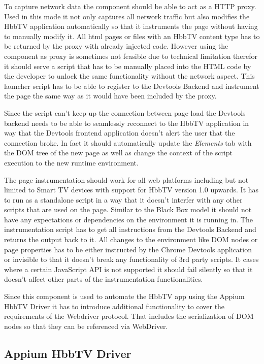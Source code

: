 To capture network data the component should be able to act as a HTTP proxy. Used in this
mode it not only captures all network traffic but also modifies the HbbTV application
automatically so that it instruments the page without having to manually modify it. All
html pages or files with an HbbTV content type has to be returned by the proxy with already
injected code. However using the component as proxy is sometimes not feasible due to technical
limitation therefor it should serve a script that has to be manually placed into the HTML code
by the developer to unlock the same functionality without the network aspect. This launcher
script has to be able to register to the Devtools Backend and instrument the page the same way
as it would have been included by the proxy.

Since the script can't keep up the connection between page load the Devtools backend needs to
be able to seamlessly reconnect to the HbbTV application in way that the Devtools frontend
application doesn't alert the user that the connection broke. In fact it should automatically
update the \textit{Elements} tab with the DOM tree of the new page as well as change the context
of the script execution to the new runtime environment.

The page instrumentation should work for all web platforms including but not limited to Smart TV
devices with support for HbbTV version 1.0 upwards. It has to run as a standalone script in
a way that it doesn't interfer with any other scripts that are used on the page. Similar to the
Black Box model it should not have any expectations or dependencies on the environment it is
running in. The instrumentation script has to get all instructions from the Devtools Backend and
returns the output back to it. All changes to the environment like DOM nodes or page properties
has to be either instructed by the Chrome Devtools application or invisible to that it doesn't
break any functionality of 3rd party scripts. It cases where a certain JavaScript API is not
supported it should fail silently so that it doesn't affect other parts of the instrumentation
functionalities.

Since this component is used to automate the HbbTV app using the Appium HbbTV Driver it has to
introduce additional functionality to cover the requirements of the Webdriver protocol. That
includes the serialization of DOM nodes so that they can be referenced via WebDriver.

\subsection{Appium HbbTV Driver}

